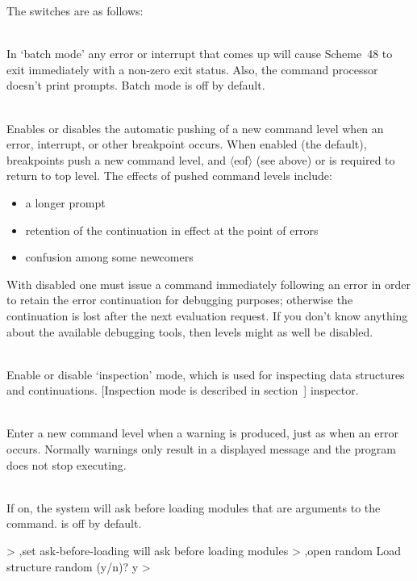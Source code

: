 The switches are as follows:
\begin{description}
\item {}\\
    In `batch mode' any error or interrupt that comes up will cause
    Scheme~48 to exit immediately with a non-zero exit status.  Also,
    the command processor doesn't print prompts.  Batch mode is
    off by default.

\item {}\\
    Enables or disables the automatic pushing of a new command level when
    an error, interrupt, or other breakpoint occurs.
    When enabled (the default), breakpoints push a new command level,
    and $\langle{}$eof$\rangle{}$ (see above)
    or  is required to return to top level.  The effects of
    pushed command levels include:
\begin{itemize}
\item a longer prompt
\item retention of the continuation in effect at the point of errors
\item confusion among some newcomers
\end{itemize}
    With  disabled one must issue a
     command immediately
    following an error in order to retain the error continuation for
    debugging purposes; otherwise the continuation is lost after the
    next evaluation request.  If you don't know anything about the
    available debugging tools, then levels might as well be disabled.

\item {}\\
    Enable or disable `inspection' mode, which is used for inspecting
    data structures and continuations.
    [Inspection mode is described in section~\Ref]
    {inspector}.

\item {}\\
    Enter a new command level when a warning is produced, just as
    when an error occurs.  Normally warnings only result in a displayed
    message and the program does not stop executing.

\item {} \\
    If on, the system will ask before loading modules that are arguments
    to the  command.   is off by
    default.
\begin{example}
> ,set ask-before-loading
will ask before loading modules
> ,open random
Load structure random (y/n)? y
>
\end{example}


\end{description}
